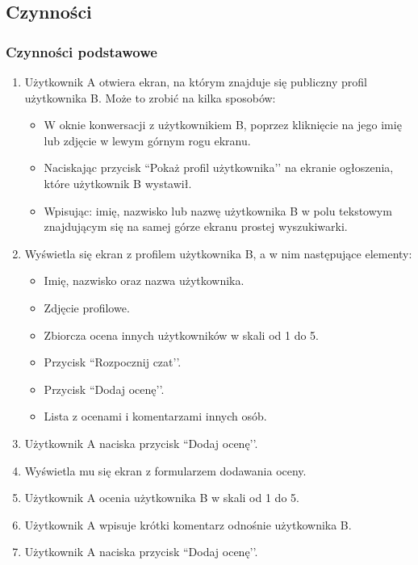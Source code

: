 \documentclass[12pt,a4paper,twoside]{article}
\begin{document}
    \subsection{Czynności}


    \subsubsection{Czynności podstawowe}


    \begin{enumerate}
        \item Użytkownik A otwiera ekran, na którym znajduje się publiczny profil użytkownika B. Może to zrobić na kilka sposobów:
        \begin{itemize}
            \item W oknie konwersacji z użytkownikiem B, poprzez kliknięcie na jego imię lub zdjęcie w lewym górnym rogu ekranu.
            \item Naciskając przycisk ``Pokaż profil użytkownika’’ na ekranie ogłoszenia, które użytkownik B wystawił.
            \item Wpisując: imię, nazwisko lub nazwę użytkownika B w polu tekstowym znajdującym się na samej górze ekranu prostej wyszukiwarki.
        \end{itemize}
        \item Wyświetla się ekran z profilem użytkownika B, a w nim następujące elementy:
        \begin{itemize}
            \item Imię, nazwisko oraz nazwa użytkownika.
            \item Zdjęcie profilowe.
            \item Zbiorcza ocena innych użytkowników w skali od 1 do 5.
            \item Przycisk ``Rozpocznij czat’’.
            \item Przycisk ``Dodaj ocenę’’.
            \item Lista z ocenami i komentarzami innych osób.
        \end{itemize}
        \item Użytkownik A naciska przycisk ``Dodaj ocenę’’.
        \item Wyświetla mu się ekran z formularzem dodawania oceny.
        \item Użytkownik A ocenia użytkownika B w skali od 1 do 5.
        \item Użytkownik A wpisuje krótki komentarz odnośnie użytkownika B.
        \item Użytkownik A naciska przycisk ``Dodaj ocenę’’.
    \end{enumerate}
\end{document}
